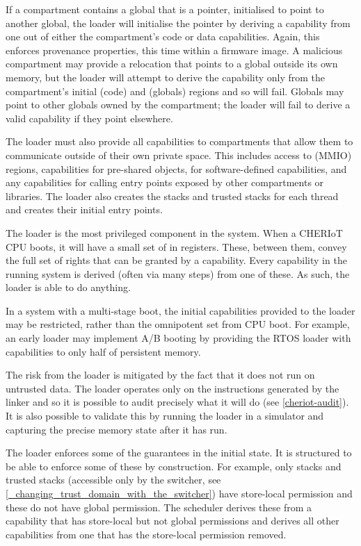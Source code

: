 If a compartment contains a global that is a pointer, initialised to point to another global, the loader will initialise the pointer by deriving a capability from one out of either the compartment's code or data capabilities.
Again, this enforces provenance properties, this time within a firmware image.
A malicious compartment may provide a relocation that points to a global outside its own memory, but the loader will attempt to derive the capability only from the compartment's initial  (code) and  (globals) regions and so will fail.
Globals may point to other globals owned by the compartment; the loader will fail to derive a valid capability if they point elsewhere.

The loader must also provide all capabilities to compartments that allow them to communicate outside of their own private space.
This includes access to  (MMIO) regions, capabilities for pre-shared objects, for software-defined capabilities, and any capabilities for calling entry points exposed by other compartments or libraries.
The loader also creates the stacks and trusted stacks for each thread and creates their initial entry points.

The loader is the most privileged component in the system.
When a CHERIoT CPU boots, it will have a small set of  in registers.
These, between them, convey the full set of rights that can be granted by a capability.
Every capability in the running system is derived (often via many steps) from one of these.
As such, the loader is able to do anything.

\begin{note}
In a system with a multi-stage boot, the initial capabilities provided to the loader may be restricted, rather than the omnipotent set from CPU boot.
For example, an early loader may implement A/B booting by providing the RTOS loader with capabilities to only half of persistent memory.
\end{note}

The risk from the loader is mitigated by the fact that it does not run on untrusted data.
The loader operates only on the instructions generated by the linker and so it is possible to audit precisely what it will do (see \ref{cheriot-audit}).
It is also possible to validate this by running the loader in a simulator and capturing the precise memory state after it has run.

The loader enforces some of the guarantees in the initial state.
It is structured to be able to enforce some of these by construction.
For example, only stacks and trusted stacks (accessible only by the switcher, see \ref{_changing_trust_domain_with_the_switcher}) have store-local permission and these do not have global permission.
The scheduler derives these from a capability that has store-local but not global permissions and derives all other capabilities from one that has the store-local permission removed.

